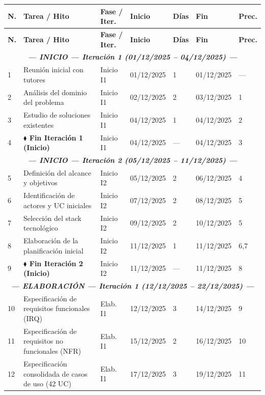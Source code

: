 \documentclass[11pt, a4paper]{article}
\begin{document}
\begin{longtable}{|p{0.6cm}|p{5.2cm}|p{2.5cm}|p{1.9cm}|p{0.9cm}|p{1.9cm}|p{1.4cm}|}
\hline
\textbf{N.} & \textbf{Tarea / Hito} & \textbf{Fase / Iter.} & \textbf{Inicio} & \textbf{Días} & \textbf{Fin} & \textbf{Prec.} \\
\hline
\endfirsthead
\hline
\textbf{N.} & \textbf{Tarea / Hito} & \textbf{Fase / Iter.} & \textbf{Inicio} & \textbf{Días} & \textbf{Fin} & \textbf{Prec.} \\
\hline
\endhead
\multicolumn{7}{|c|}{\textit{\textbf{--- INICIO --- Iteración 1 (01/12/2025 -- 04/12/2025) ---}}} \\
\hline
1 & Reunión inicial con tutores & Inicio I1 & 01/12/2025 & 1 & 01/12/2025 & --- \\
\hline
2 & Análisis del dominio del problema & Inicio I1 & 02/12/2025 & 2 & 03/12/2025 & 1 \\
\hline
3 & Estudio de soluciones existentes & Inicio I1 & 04/12/2025 & 1 & 04/12/2025 & 2 \\
\hline
4 & \textbf{$\blacklozenge$ Fin Iteración 1 (Inicio)} & Inicio I1 & 04/12/2025 & --- & 04/12/2025 & 3 \\
\hline
\multicolumn{7}{|c|}{\textit{\textbf{--- INICIO --- Iteración 2 (05/12/2025 -- 11/12/2025) ---}}} \\
\hline
5 & Definición del alcance y objetivos & Inicio I2 & 05/12/2025 & 2 & 06/12/2025 & 4 \\
\hline
6 & Identificación de actores y UC iniciales & Inicio I2 & 07/12/2025 & 2 & 08/12/2025 & 5 \\
\hline
7 & Selección del stack tecnológico & Inicio I2 & 09/12/2025 & 2 & 10/12/2025 & 5 \\
\hline
8 & Elaboración de la planificación inicial & Inicio I2 & 11/12/2025 & 1 & 11/12/2025 & 6,7 \\
\hline
9 & \textbf{$\blacklozenge$ Fin Iteración 2 (Inicio)} & Inicio I2 & 11/12/2025 & --- & 11/12/2025 & 8 \\
\hline
\multicolumn{7}{|c|}{\textit{\textbf{--- ELABORACIÓN --- Iteración 1 (12/12/2025 -- 22/12/2025) ---}}} \\
\hline
10 & Especificación de requisitos funcionales (IRQ) & Elab. I1 & 12/12/2025 & 3 & 14/12/2025 & 9 \\
\hline
11 & Especificación de requisitos no funcionales (NFR) & Elab. I1 & 15/12/2025 & 2 & 16/12/2025 & 10 \\
\hline
12 & Especificación consolidada de casos de uso (42 UC) & Elab. I1 & 17/12/2025 & 3 & 19/12/2025 & 11 \\

\end{longtable}
\end{document}
